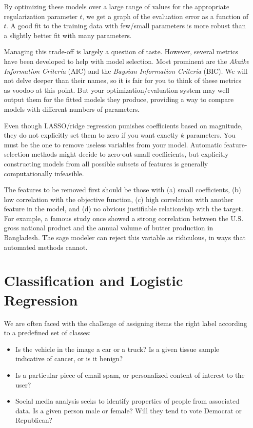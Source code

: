 \documentclass[10pt]{article}
\begin{document}
By optimizing these models over a large range of values for the appropriate regularization parameter \(t\), we get a graph of the evaluation error as a function of \(t\). A good fit to the training data with few/small parameters is more robust than a slightly better fit with many parameters.

Managing this trade-off is largely a question of taste. However, several metrics have been developed to help with model selection. Most prominent are the \emph{Akaike Information Criteria} (AIC) and the \emph{Baysian Information Criteria} (BIC). We will not delve deeper than their names, so it is fair for you to think of these metrics as voodoo at this point. But your optimization/evaluation system may well output them for the fitted models they produce, providing a way to compare models with different numbers of parameters.

Even though LASSO/ridge regression punishes coefficients based on magnitude, they do not explicitly set them to zero if you want exactly \(k\) parameters. You must be the one to remove useless variables from your model. Automatic feature-selection methods might decide to zero-out small coefficients, but explicitly constructing models from all possible subsets of features is generally computationally infeasible.

The features to be removed first should be those with (a) small coefficients, (b) low correlation with the objective function, (c) high correlation with another feature in the model, and (d) no obvious justifiable relationship with the target. For example, a famous study once showed a strong correlation between the U.S. gross national product and the annual volume of butter production in Bangladesh. The sage modeler can reject this variable as ridiculous, in ways that automated methods cannot.

\section{Classification and Logistic Regression}
We are often faced with the challenge of assigning items the right label according to a predefined set of classes:

\begin{itemize}
  \item Is the vehicle in the image a car or a truck? Is a given tissue sample indicative of cancer, or is it benign?
  \item Is a particular piece of email spam, or personalized content of interest to the user?
  \item Social media analysis seeks to identify properties of people from associated data. Is a given person male or female? Will they tend to vote Democrat or Republican?
\end{itemize}
\end{document}
